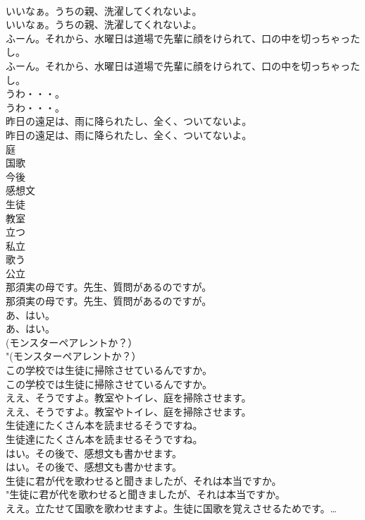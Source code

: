 \documentclass[8pt]{extreport}
\begin{document}
\begin{CJK}{UTF8}{min}
\\	いいなぁ。うちの親、洗濯してくれないよ。	
\\	いいなぁ。うちの親、洗濯してくれないよ。 
\\	ふーん。それから、水曜日は道場で先輩に顔をけられて、口の中を切っちゃったし。	
\\	ふーん。それから、水曜日は道場で先輩に顔をけられて、口の中を切っちゃったし。 
\\	うわ・・・。	
\\	うわ・・・。 
\\	昨日の遠足は、雨に降られたし、全く、ついてないよ。	
\\	昨日の遠足は、雨に降られたし、全く、ついてないよ。 
\\	庭
\\	国歌
\\	今後
\\	感想文
\\	生徒
\\	教室
\\	立つ
\\	私立
\\	歌う
\\	公立
\\	那須実の母です。先生、質問があるのですが。	
\\	那須実の母です。先生、質問があるのですが。 
\\	あ、はい。	
\\	あ、はい。 
\\	(モンスターペアレントか？）	
\\	"(モンスターペアレントか？） 
\\	この学校では生徒に掃除させているんですか。	
\\	この学校では生徒に掃除させているんですか。 
\\	ええ、そうですよ。教室やトイレ、庭を掃除させます。	
\\	ええ、そうですよ。教室やトイレ、庭を掃除させます。 
\\	生徒達にたくさん本を読ませるそうですね。	
\\	生徒達にたくさん本を読ませるそうですね。 
\\	はい。その後で、感想文も書かせます。	
\\	はい。その後で、感想文も書かせます。 
\\	生徒に君が代を歌わせると聞きましたが、それは本当ですか。	
\\	"生徒に君が代を歌わせると聞きましたが、それは本当ですか。 
\\	ええ。立たせて国歌を歌わせますよ。生徒に国歌を覚えさせるためです。…	

\end{CJK}
\end{document}
